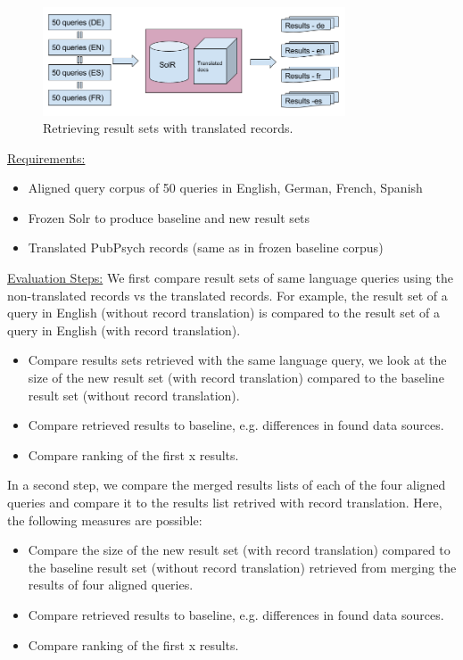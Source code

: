 \documentclass[a4paper,11pt]{article}
\begin{document}
\begin{figure}[h]
	\centering
  \includegraphics[width=0.8\textwidth]{./img/translated_docs.png}
	\caption{Retrieving result sets with translated records.}
	\label{fig4}
\end{figure}

\underline{Requirements:}
\begin{itemize}
\item Aligned query corpus of 50 queries in English, German, French, Spanish
\item Frozen Solr to produce baseline and new result sets
\item Translated PubPsych records (same as in frozen baseline corpus)
\end{itemize}

\underline{Evaluation Steps:}
\newline
We first compare result sets of same language queries using the non-translated records vs the translated records. For example, the result set of a query in English (without record translation) is compared to the result set of a query in English (with record translation). 
\begin{itemize}
\item Compare results sets retrieved with the same language query, we look at the size of the new result set (with record translation) compared to the baseline result set (without record translation).
\item Compare retrieved results to baseline, e.g. differences in found data sources.
\item Compare ranking of the first x results.
\end{itemize}

In a second step, we compare the merged results lists of each of the four aligned queries and compare it to the results list retrived with record translation. Here, the following measures are possible:

\begin{itemize}
\item Compare  the size of the new result set (with record translation) compared to the baseline result set (without record translation) retrieved from merging the results of four aligned queries.
\item Compare retrieved results to baseline, e.g. differences in found data sources.
\item Compare ranking of the first x results.
\end{itemize}
\end{document}
